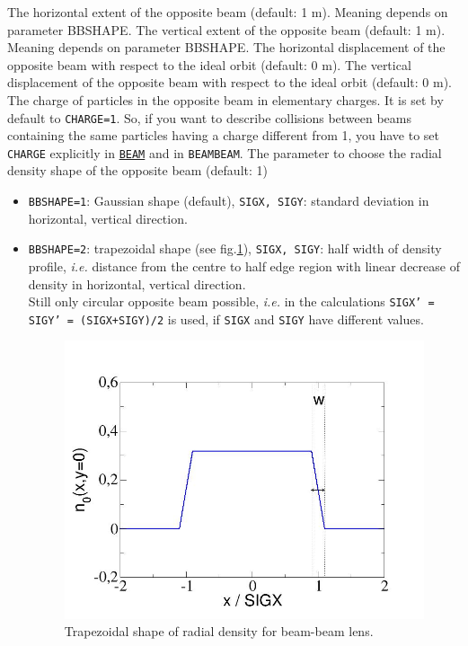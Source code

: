 \begin{madlist}
     The horizontal extent of the opposite beam (default: 1 m).
     Meaning depends on parameter BBSHAPE.
     The vertical extent of the opposite beam (default: 1 m).
     Meaning depends on parameter BBSHAPE.
     The horizontal displacement of the opposite beam with respect to
     the ideal orbit (default: 0 m).
     The vertical displacement of the opposite beam with respect to
     the ideal orbit (default: 0 m).
     The charge of particles in the opposite beam in elementary charges. 
     It is set by default to \texttt{CHARGE=1}. So, if you want to describe 
     collisions 
     between beams containing the same particles having a charge different 
     from 1, you have to set \texttt{CHARGE} explicitly in
     \hyperref[sec:beam]{\texttt{BEAM}} and in \texttt{BEAMBEAM}.  
    The parameter to choose the radial density shape of the 
     opposite beam (default: 1)
     \begin{itemize}
       \item  \texttt{BBSHAPE=1}: Gaussian shape (default), \texttt{SIGX, SIGY}: 
       standard deviation in horizontal, vertical direction.
       \item  \texttt{BBSHAPE=2}: trapezoidal shape (see 
       fig.\ref{fig:beambeam-n-trapez}), \texttt{SIGX, SIGY}: half width of 
       density profile, \textsl{i.e.} distance from the centre to half
       edge region with linear decrease of density in horizontal,
       vertical direction. \\ 
       Still only circular opposite beam possible, \textsl{i.e.} in the
       calculations
       \texttt{SIGX' = SIGY' = (SIGX+SIGY)/2} is used, if \texttt{SIGX} and
       \texttt{SIGY} have different values.

\begin{figure}[h]
  \centering
  \includegraphics[width=400bp]{jpg/beambeam_n_trapez.jpg}
  \caption{Trapezoidal shape of radial density for beam-beam lens.} 
  \label{fig:beambeam-n-trapez}
\end{figure}


\end{itemize}
\end{madlist}
